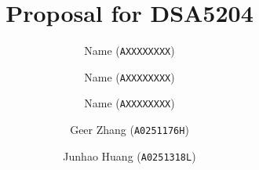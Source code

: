 \author{
  Name (\texttt{AXXXXXXXX})
  \and
  Name (\texttt{AXXXXXXXX})
  \and
  Name (\texttt{AXXXXXXXX})
  \and
  Geer Zhang (\texttt{A0251176H})
  \and
  Junhao Huang (\texttt{A0251318L})
}

\title{Proposal for DSA5204}
\date{}
